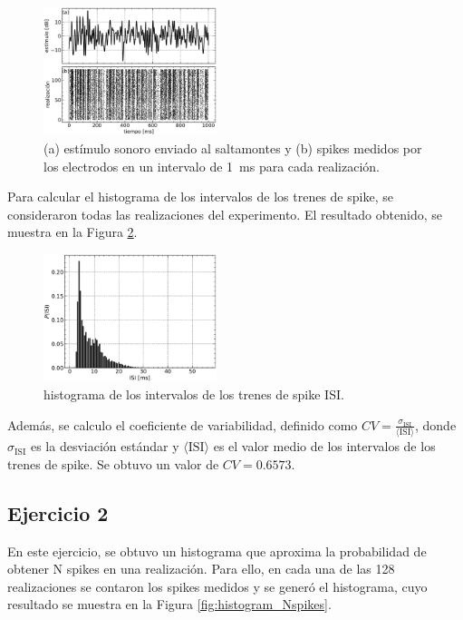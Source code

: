 \documentclass[11pt, twocolumn]{article}
\begin{document}
{\begin{figure} [htbp]
    \centering
    \includegraphics[width=0.45\textwidth]{figures/estimu_spikes.pdf}
    \caption{(a) estímulo sonoro enviado al saltamontes y (b) spikes medidos por los electrodos en un intervalo de \SI{1}{\milli\second} para cada realización.}
    \label{fig:estimulo_spikes}
\end{figure}


Para calcular el histograma de los intervalos de los trenes de spike, se consideraron todas las realizaciones del experimento. El resultado obtenido, se muestra en la Figura \ref{fig:histogram_ISI}.

\begin{figure} [htbp]
    \centering
    \includegraphics[width=0.45\textwidth]{figures/ISI.pdf}
    \caption{histograma de los intervalos de los trenes de spike ISI.}
    \label{fig:histogram_ISI}
\end{figure}

Además, se calculo el coeficiente de variabilidad, definido como \(CV = \frac{\sigma_\text{ISI}}{\langle \text{ISI} \rangle}\), donde \(\sigma_\text{ISI}\) es la desviación estándar y \(\langle \text{ISI} \rangle\) es el valor medio de los intervalos de los trenes de spike. Se obtuvo un valor de \(CV = 0.6573\).

\subsection*{Ejercicio 2}
En este ejercicio, se obtuvo un histograma que aproxima la probabilidad de obtener N spikes en una realización. Para ello, en cada una de las 128 realizaciones se contaron los spikes medidos y se generó el histograma, cuyo resultado se muestra en la Figura \ref{fig:histogram_Nspikes}.

}
\end{document}
